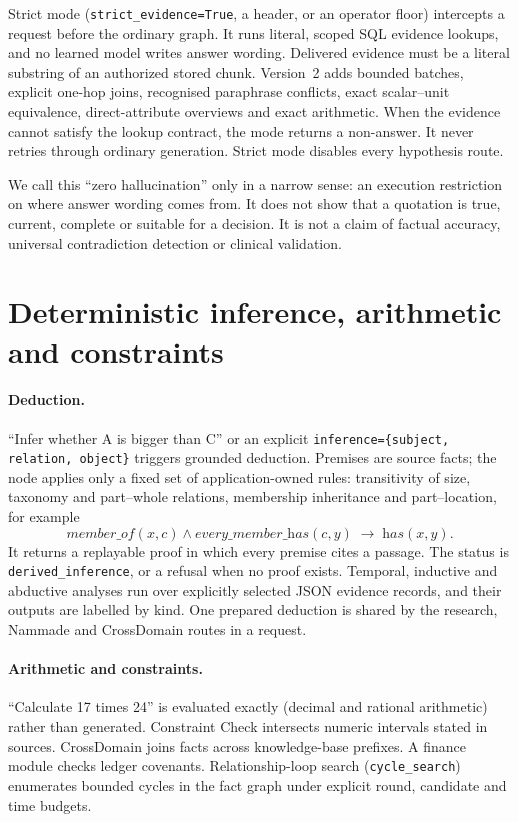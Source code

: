 \documentclass[11pt]{article}
\begin{document}
Strict mode (\texttt{strict\_evidence=True}, a header, or an operator floor) intercepts a request before the
ordinary graph. It runs literal, scoped SQL evidence lookups, and no learned model writes answer wording. Delivered
evidence must be a literal substring of an authorized stored chunk. Version~2 adds bounded batches, explicit
one-hop joins, recognised paraphrase conflicts, exact scalar--unit equivalence, direct-attribute overviews and
exact arithmetic. When the evidence cannot satisfy the lookup contract, the mode returns a non-answer. It never
retries through ordinary generation. Strict mode disables every hypothesis route.

We call this ``zero hallucination'' only in a narrow sense: an execution restriction on where answer wording
comes from. It does not show that a quotation is true, current, complete or suitable for a decision. It is not a
claim of factual accuracy, universal contradiction detection or clinical validation.

\section{Deterministic inference, arithmetic and constraints}
\label{sec:inference}

\paragraph{Deduction.} ``Infer whether A is bigger than C'' or an explicit
\texttt{inference=\{subject, relation, object\}} triggers grounded deduction. Premises are source facts; the node
applies only a fixed set of application-owned rules: transitivity of size, taxonomy and part--whole relations,
membership inheritance and part--location, for example
\[
\textit{member\_of}(x,c)\wedge\textit{every\_member\_has}(c,y)\;\to\;\textit{has}(x,y).
\] It returns a replayable proof in which every premise cites a passage. The status is \texttt{derived\_inference}, or a
refusal when no proof exists. Temporal, inductive and abductive analyses run over explicitly selected JSON
evidence records, and their outputs are labelled by kind. One prepared deduction is shared by the research,
Nammade and CrossDomain routes in a request.

\paragraph{Arithmetic and constraints.} ``Calculate 17 times 24'' is evaluated exactly (decimal and rational
arithmetic) rather than generated. Constraint Check intersects numeric intervals stated in sources. CrossDomain joins facts
across knowledge-base prefixes. A finance module checks ledger covenants. Relationship-loop search
(\texttt{cycle\_search}) enumerates bounded cycles in the fact graph under explicit round, candidate and time
budgets.
\end{document}
